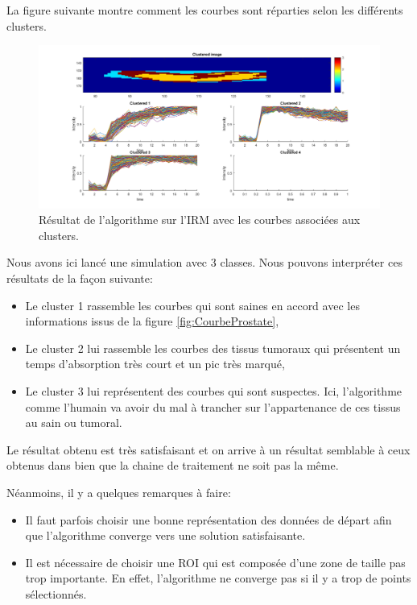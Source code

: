 La figure suivante montre comment les courbes sont réparties selon les différents clusters.

\begin{figure}[H]
\centering
    \includegraphics[scale=0.4,angle=0]{Images/3classProstate.png}
    \caption{Résultat de l'algorithme sur l'IRM avec les courbes associées aux clusters.}
    \label{fig:3classProstate}
\end{figure}

Nous avons ici lancé une simulation avec 3 classes. Nous pouvons interpréter ces résultats de la façon suivante:

\begin{itemize}
\item Le cluster 1 rassemble les courbes qui sont saines en accord avec les informations issus de la figure \ref{fig:CourbeProstate},
\item Le cluster 2 lui rassemble les courbes des tissus tumoraux qui présentent un temps d'absorption très court et un pic très marqué,
\item Le cluster 3 lui représentent des courbes qui sont suspectes. Ici, l'algorithme comme l'humain va avoir du mal à trancher sur l'appartenance de ces tissus au sain ou tumoral.
\end{itemize}

Le résultat obtenu est très satisfaisant et on arrive à un résultat semblable à ceux obtenus dans \cite{doi2007computer} bien que la chaine de traitement ne soit pas la même. 

Néanmoins, il y a quelques remarques à faire:

\begin{itemize}
\item Il faut parfois choisir une bonne représentation des données de départ afin que l'algorithme converge vers une solution satisfaisante.
\item Il est nécessaire de choisir une ROI qui est composée d'une zone de taille pas trop importante. En effet, l'algorithme ne converge pas si il y a trop de points sélectionnés.
\end{itemize}


